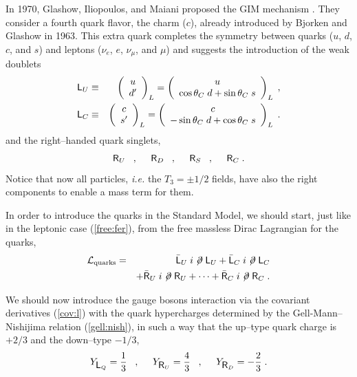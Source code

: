 \documentclass[12pt]{report}
\def\text#1{{\scriptstyle\mathrm{#1}}}
\newcommand{\ld}{\mbox{\sf L}}
\newcommand{\rs}{\mbox{\sf R}}
\newcommand{\lag}{{\cal L}}
\newcommand{\dels}{\not \! \partial}
\newcommand{\ba}{\begin{array}}
\newcommand{\ea}{\end{array}}
\begin{document}
In 1970, Glashow, Iliopoulos, and Maiani proposed the GIM mechanism
\cite{Glashow:70}. They consider a fourth quark flavor, the charm
($c$), already introduced by Bjorken and Glashow in 1963. This extra
quark completes the symmetry between quarks ($u$, $d$, $c$, and $s$)
and leptons ($\nu_e$, $e$, $\nu_\mu$, and $\mu$) and suggests the
introduction of the weak doublets
\begin{eqnarray}
\ld_U & \equiv & \left( \ba{c}
	      		u\\
	      	 	d^\prime
              \ea \right)_L  = 
              \left( \ba{c}
              u\\
              \cos\theta_C \; d + \sin\theta_C \; s
                  \ea \right)_L 
              \; , \nonumber \\
\ld_C & \equiv & \left( \ba{c}
	      		c\\
	      		s^\prime
              \ea \right)_L  = 
              \left( \ba{c}
              c\\
               -\sin\theta_C \; d +  \cos\theta_C \; s
                  \ea \right)_L \; .
\label{dou:qua}
\end{eqnarray}
and the right--handed quark singlets,
\begin{equation}
\rs_U \;\;\; , \;\;\;\;\; \rs_D \;\;\; , \;\;\;\;\;  
\rs_S \;\;\; , \;\;\;\;\; \rs_C  \; .
\label{sin:qua}
\end{equation}
Notice that now all particles, {\it i.e.} the $T_3 = \pm 1/2$
fields,  have also the right components to enable a mass term for
them.

In order to introduce the quarks in the Standard Model, we should
start, just like in the leptonic case (\ref{free:fer}), from the free
massless Dirac Lagrangian for the quarks,
\begin{eqnarray}
\lag_{\text{quarks}} &=& \bar{\ld}_U \; i \dels \; \ld_U 
+ \bar{\ld}_C \; i \dels \; \ld_C \nonumber \\
&& + \bar{\rs}_U \; i \dels \; \rs_U + \cdots + 
\bar{\rs}_C \; i \dels \; \rs_C \; .
\label{l:qua}
\end{eqnarray}

We should now introduce the gauge bosons interaction via the
covariant derivatives (\ref{cov:l}) with the quark hypercharges
determined by the Gell-Mann--Ni\-shi\-ji\-ma relation
(\ref{gell:nish}), in such a way that the up--type quark charge is
$+2/3$ and the down--type $-1/3$,
\begin{equation}
Y_{\ld_Q} =   \frac{1}{3}  \;\;\; , \;\;\;\;\;
Y_{\rs_U} =   \frac{4}{3}  \;\;\; , \;\;\;\;\;
Y_{\rs_D} = - \frac{2}{3} \; .
\label{hyp:qua}
\end{equation}
\end{document}

